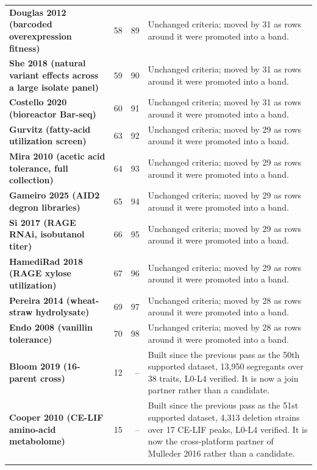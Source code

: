 \begin{longtable}{@{}L{46mm} r@{\hspace{6pt}} r@{\hspace{6pt}} L{104mm}@{}}
\addlinespace[5pt]
\textbf{Douglas 2012 (barcoded overexpression fitness)} & 58 & 89 & Unchanged criteria; moved by 31 as rows around it were promoted into a band. \\
\addlinespace[5pt]
\textbf{She 2018 (natural variant effects across a large isolate panel)} & 59 & 90 & Unchanged criteria; moved by 31 as rows around it were promoted into a band. \\
\addlinespace[5pt]
\textbf{Costello 2020 (bioreactor Bar-seq)} & 60 & 91 & Unchanged criteria; moved by 31 as rows around it were promoted into a band. \\
\addlinespace[5pt]
\textbf{Gurvitz (fatty-acid utilization screen)} & 63 & 92 & Unchanged criteria; moved by 29 as rows around it were promoted into a band. \\
\addlinespace[5pt]
\textbf{Mira 2010 (acetic acid tolerance, full collection)} & 64 & 93 & Unchanged criteria; moved by 29 as rows around it were promoted into a band. \\
\addlinespace[5pt]
\textbf{Gameiro 2025 (AID2 degron libraries)} & 65 & 94 & Unchanged criteria; moved by 29 as rows around it were promoted into a band. \\
\addlinespace[5pt]
\textbf{Si 2017 (RAGE RNAi, isobutanol titer)} & 66 & 95 & Unchanged criteria; moved by 29 as rows around it were promoted into a band. \\
\addlinespace[5pt]
\textbf{HamediRad 2018 (RAGE xylose utilization)} & 67 & 96 & Unchanged criteria; moved by 29 as rows around it were promoted into a band. \\
\addlinespace[5pt]
\textbf{Pereira 2014 (wheat-straw hydrolysate)} & 69 & 97 & Unchanged criteria; moved by 28 as rows around it were promoted into a band. \\
\addlinespace[5pt]
\textbf{Endo 2008 (vanillin tolerance)} & 70 & 98 & Unchanged criteria; moved by 28 as rows around it were promoted into a band. \\
\addlinespace[5pt]
\textbf{Bloom 2019 (16-parent cross)} & 12 & -- & Built since the previous pass as the 50th supported dataset, 13,950 segregants over 38 traits, L0-L4 verified. It is now a join partner rather than a candidate. \\
\addlinespace[5pt]
\textbf{Cooper 2010 (CE-LIF amino-acid metabolome)} & 15 & -- & Built since the previous pass as the 51st supported dataset, 4,313 deletion strains over 17 CE-LIF peaks, L0-L4 verified. It is now the cross-platform partner of Mulleder 2016 rather than a candidate. \\
\addlinespace[5pt]
\end{longtable}
\endgroup
